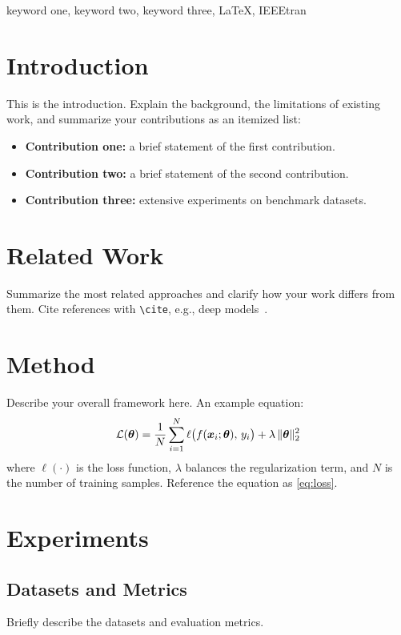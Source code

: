 \begin{IEEEkeywords}
  keyword one, keyword two, keyword three, LaTeX, IEEEtran
\end{IEEEkeywords}

\section{Introduction}
This is the introduction. Explain the background, the limitations of
existing work, and summarize your contributions as an itemized list:

\begin{itemize}
  \item \textbf{Contribution one:} a brief statement of the first contribution.
  \item \textbf{Contribution two:} a brief statement of the second contribution.
  \item \textbf{Contribution three:} extensive experiments on benchmark datasets.
\end{itemize}

\section{Related Work}
Summarize the most related approaches and clarify how your work differs
from them. Cite references with \verb|\cite|, e.g., deep models~\cite{lecun2015}.

\section{Method}
Describe your overall framework here. An example equation:
\begin{equation}
  \mathcal{L}(\boldsymbol{\theta}) =
  \frac{1}{N} \sum_{i=1}^{N}
  \ell \bigl( f(\boldsymbol{x}_i; \boldsymbol{\theta}),\, y_i \bigr)
  + \lambda \, \lVert \boldsymbol{\theta} \rVert_2^2
  \label{eq:loss}
\end{equation}
where $\ell(\cdot)$ is the loss function, $\lambda$ balances the
regularization term, and $N$ is the number of training samples.
Reference the equation as \eqref{eq:loss}.

\section{Experiments}
\subsection{Datasets and Metrics}
Briefly describe the datasets and evaluation metrics.

